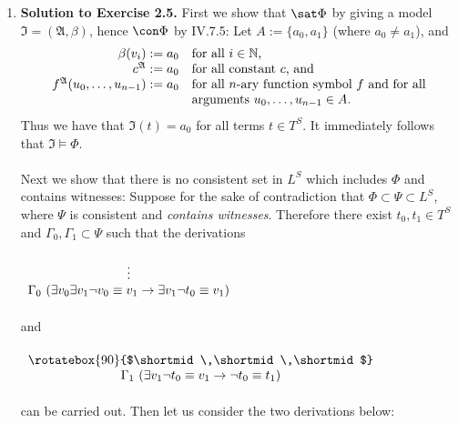 \begin{enumerate}[1.]
\begin{enumerate}[(1)]
\end{enumerate}
%
\item \textbf{Solution to Exercise 2.5.} First we show that $\sat \Phi$ by giving a model $\mathfrak{I} = (\mathfrak{A}, \beta)$, hence $\con \Phi$ by IV.7.5: Let $A := \{ a_0, a_1 \}$ (where $a_0 \neq a_1$), and
\[
\begin{array}{rl}
\beta(v_i) := a_0 & \mbox{for all $i \in \mathbb{N}$,} \cr
c^\mathfrak{A} := a_0 & \mbox{for all constant $c$, and} \cr
f^\mathfrak{A}(u_0, \ldots, u_{n - 1}) := a_0 & \mbox{for all $n$-ary function symbol $f$ and for all} \cr
\  & \mbox{arguments $u_0, \ldots, u_{n - 1} \in A$.}
\end{array}
\]
Thus we have that $\mathfrak{I}(t) = a_0$ for all terms $t \in T^S$. It immediately follows that $\mathfrak{I} \models \Phi$.\\
\\
Next we show that there is no consistent set in $L^S$ which includes $\Phi$ and contains witnesses: Suppose for the sake of contradiction that $\Phi \subset \Psi \subset L^S$, where $\Psi$ is consistent and \emph{contains witnesses}. Therefore there exist $t_0, t_1 \in T^S$ and $\Gamma_0, \Gamma_1 \subset \Psi$ such that the derivations\\ \ \\ \phantom{an}
\begin{math}
\begin{array}{c}
\vdots \cr
\Gamma_0 \  (\exists v_0 \exists v_1 \neg v_0 \equiv v_1 \rightarrow \exists v_1 \neg t_0 \equiv v_1)
\end{array}
\end{math}
\\ \ \\and\\ \ \\ \phantom{an}
\begin{math}
\begin{array}{c}
\mbox{\rotatebox{90}{$\shortmid\,\shortmid\,\shortmid$}} \cr
\Gamma_1 \  (\exists v_1 \neg t_0 \equiv v_1 \rightarrow \neg t_0 \equiv t_1)
\end{array}
\end{math}
\\ \ \\can be carried out. Then let us consider the two derivations below:\\ \ \\ \phantom{an}
\begin{math}

\end{math}
\end{enumerate}

